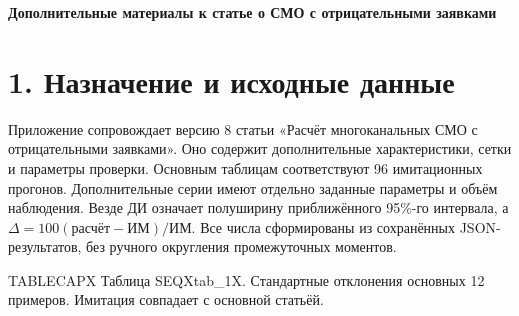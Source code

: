 
\begin{center}\Large\bfseries Дополнительные материалы к статье о СМО с отрицательными заявками\end{center}
\section*{1. Назначение и исходные данные}
Приложение сопровождает версию 8 статьи «Расчёт многоканальных СМО с отрицательными заявками». Оно содержит дополнительные характеристики, сетки и параметры проверки. Основным таблицам соответствуют 96 имитационных прогонов. Дополнительные серии имеют отдельно заданные параметры и объём наблюдения. Везде ДИ означает полуширину приближённого 95\%-го интервала, а \(\Delta=100(\text{расчёт}-\text{ИМ})/\text{ИМ}\). Все числа сформированы из сохранённых JSON-результатов, без ручного округления промежуточных моментов.

\noindent TABLECAPX Таблица SEQXtab_1X. Стандартные отклонения основных 12 примеров. Имитация совпадает с основной статьёй.\par

